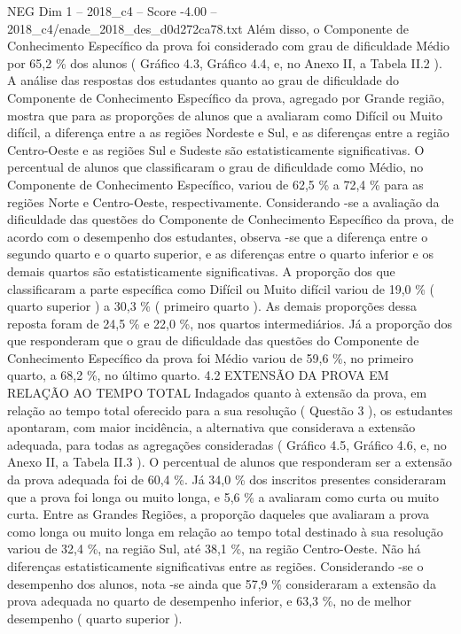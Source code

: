 \begin{textsample}{NEG Dim 1 – 2018\_c4 – Score -4.00 – 2018\_c4/enade\_2018\_des\_d0d272ca78.txt}
Além disso, o Componente de Conhecimento Específico da prova foi considerado com grau de dificuldade Médio por 65,2 \% dos alunos ( Gráfico 4.3, Gráfico 4.4, e, no Anexo II, a Tabela II.2 ).
A análise das respostas dos estudantes quanto ao grau de dificuldade do Componente de Conhecimento Específico da prova, agregado por Grande região, mostra que para as proporções de alunos que a avaliaram como Difícil ou Muito difícil, a diferença entre a as regiões Nordeste e Sul, e as diferenças entre a região Centro-Oeste e as regiões Sul e Sudeste são estatisticamente significativas.
O percentual de alunos que classificaram o grau de dificuldade como Médio, no Componente de Conhecimento Específico, variou de 62,5 \% a 72,4 \% para as regiões Norte e Centro-Oeste, respectivamente.
Considerando -se a avaliação da dificuldade das questões do Componente de Conhecimento Específico da prova, de acordo com o desempenho dos estudantes, observa -se que a diferença entre o segundo quarto e o quarto superior, e as diferenças entre o quarto inferior e os demais quartos são estatisticamente significativas.
A proporção dos que classificaram a parte específica como Difícil ou Muito difícil variou de 19,0 \% ( quarto superior ) a 30,3 \% ( primeiro quarto ).
As demais proporções dessa reposta foram de 24,5 \% e 22,0 \%, nos quartos intermediários.
Já a proporção dos que responderam que o grau de dificuldade das questões do Componente de Conhecimento Específico da prova foi Médio variou de 59,6 \%, no primeiro quarto, a 68,2 \%, no último quarto. 4.2 EXTENSÃO DA PROVA EM RELAÇÃO AO TEMPO TOTAL Indagados quanto à extensão da prova, em relação ao tempo total oferecido para a sua resolução ( Questão 3 ), os estudantes apontaram, com maior incidência, a alternativa que considerava a extensão adequada, para todas as agregações consideradas ( Gráfico 4.5, Gráfico 4.6, e, no Anexo II, a Tabela II.3 ).
O percentual de alunos que responderam ser a extensão da prova adequada foi de 60,4 \%.
Já 34,0 \% dos inscritos presentes consideraram que a prova foi longa ou muito longa, e 5,6 \% a avaliaram como curta ou muito curta.
Entre as Grandes Regiões, a proporção daqueles que avaliaram a prova como longa ou muito longa em relação ao tempo total destinado à sua resolução variou de 32,4 \%, na região Sul, até 38,1 \%, na região Centro-Oeste.
Não há diferenças estatisticamente significativas entre as regiões.
Considerando -se o desempenho dos alunos, nota -se ainda que 57,9 \% consideraram a extensão da prova adequada no quarto de desempenho inferior, e 63,3 \%, no de melhor desempenho ( quarto superior ).

\end{textsample}
